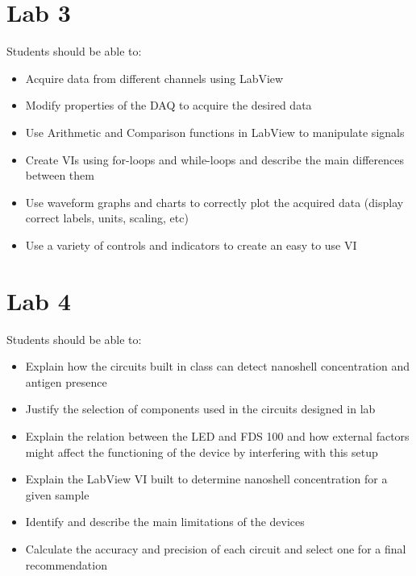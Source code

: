 \documentclass{article}
\begin{document}
\section*{Lab 3}
Students should be able to:
\begin{itemize}
	\item Acquire data from different channels using LabView   
	\item Modify properties of the DAQ to acquire the desired data   
	\item Use Arithmetic and Comparison functions in LabView to manipulate signals   
	\item Create VIs using for-loops and while-loops and describe the main differences between them   
	\item Use waveform graphs and charts to correctly plot the acquired data (display correct labels, units, scaling, etc)   
	\item Use a variety of controls and indicators to create an easy to use VI   
\end{itemize}

\section*{Lab 4}
Students should be able to:
\begin{itemize}
	\item Explain how the circuits built in class can detect nanoshell concentration and antigen presence   
	\item Justify the selection of components used in the circuits designed in lab   
	\item Explain the relation between the LED and FDS 100 and how external factors might affect the functioning of the device by interfering with this setup   
	\item Explain the LabView VI built to determine nanoshell concentration for a given sample   
	\item Identify and describe the main limitations of the devices   
	\item Calculate the accuracy and precision of each circuit and select one for a final recommendation 
\end{itemize}
\end{document}
